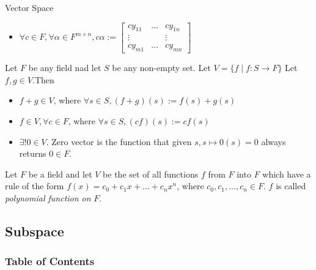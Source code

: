 \documentclass[8pt]{beamer}
\newcommand{\ti}[1]{\textit{#1}}
\begin{document}
\begin{frame}{Vector Space}
    \begingroup
        \begin{itemize}
            \item $\forall c \in F,\forall \alpha \in F^{m\times n}, c\alpha := \left[\begin{matrix}
                cy_{11} & \dots & cy_{1n} \\ \vdots & & \vdots \\ cy_{m1} & \dots & cy_{mn} 
            \end{matrix}\right]$
        \end{itemize}
    \endgroup

    \begin{example}
        Let $F$ be any field nad let $S$ be any non-empty set. Let $V = \{ f \mid f \colon S \to F \}$ Let $f,g \in V$.Then

        \begin{itemize}
            \item $f + g \in V $, where $\forall s \in S, (f + g)(s) := f(s) + g(s)$
            \item $f \in V, \forall c \in F$, where $\forall s \in S, (cf)(s) := cf(s)$
            \item $\exists ! 0 \in V$. Zero vector is the function that given $s, s \mapsto 0(s) = 0$ always returns $0 \in F$. 
        \end{itemize}
    \end{example}

    \begin{example}
        Let $F$ be a field and let $V$ be the set of all functions $f$ from $F$ into $F$ which have a rule of the form $f(x) = c_0 + c_1 x + \dots + c_n x^n$, where $c_0, c_1, \dots, c_n \in F$. $f$ is called \ti{polynomial function on} $F$.
    \end{example}
    
\end{frame}


\subsection{Subspace}

\begin{frame}
    \frametitle{Table of Contents}
    \tableofcontents[currentsubsection]
\end{frame}
\end{document}
